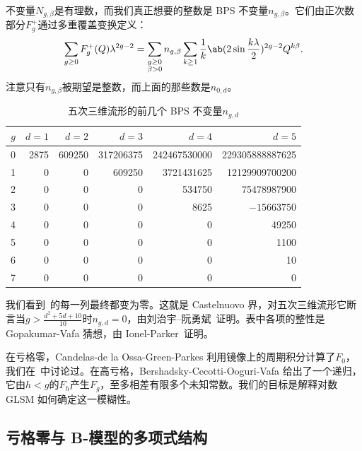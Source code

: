 \documentclass{amsart}
\theoremstyle{definition}
\theoremstyle{remark}
\theoremstyle{plain}
\theoremstyle{definition}
\theoremstyle{remark}
\newcommand{\1}{\mathbf{1}}
\newcommand{\2}{\mathbf{2}}
\newcommand{\3}{\mathbf{3}}
\begin{document}
不变量\(N_{g,\beta}\)是有理数，而我们真正想要的整数是 BPS 不变量\(n_{g,\beta}\)。它们由正次数部分\(F_g^+\)通过多重覆盖变换定义：
\[ \sum_{g \geq 0} F_g^+(Q)\lambda^{2g-2} = \sum_{\substack{g \geq 0 \\ \beta > 0}} n_{g,\beta} \sum_{k \geq 1} \frac{1}{k} \ab(2 \sin \frac{k\lambda}{2})^{2g-2}Q^{k\beta}. \]
注意只有\(n_{g,\beta}\)被期望是整数，而上面的那些数是\(n_{0,d}\)。

\begin{table}[htpb]
    \centering
    \caption{五次三维流形的前几个 BPS 不变量\(n_{g,d}\)}
    \label{tab:quinticbps}
    \begin{tabular}{crrrrr}
        \toprule
        \(g\) & \(d=1\) & \(d=2\) & \(d=3\) & \(d=4\) & \(d=5\) \\
        \midrule
        0 & 2875 & 609250 & 317206375 & 242467530000 & 229305888887625 \\
        1 & 0 & 0 & 609250 & 3721431625 & 12129909700200 \\
        2 & 0 & 0 & 0 & 534750 & 75478987900 \\
        3 & 0 & 0 & 0 & 8625 & \(-15663750\) \\
        4 & 0 & 0 & 0 & 0 & 49250 \\
        5 & 0 & 0 & 0 & 0 & 1100 \\
        6 & 0 & 0 & 0 & 0 & 10 \\
        7 & 0 & 0 & 0 & 0 & 0 \\
        \bottomrule
    \end{tabular}
\end{table}

我们看到~的每一列最终都变为零。这就是 Castelnuovo 界，对五次三维流形它断言当\(g > \frac{d^2+5d+10}{10}\)时\(n_{g,d} = 0\)，由刘治宇–阮勇斌~\cite{LiuRuanCastelnuovo}证明。表中各项的整性是 Gopakumar-Vafa 猜想，由 Ionel-Parker~\cite{IonelParker2018}证明。

在亏格零，Candelas-de la Ossa-Green-Parkes 利用镜像上的周期积分计算了\(F_0\)，我们在~中讨论过。在高亏格，Bershadsky-Cecotti-Ooguri-Vafa 给出了一个递归，它由\(h < g\)的\(F_h\)产生\(F_g\)，至多相差有限多个未知常数。我们的目标是解释对数 GLSM 如何确定这一模糊性。

\subsection{亏格零与 B-模型的多项式结构}%
\label{sub:Genus zero and the polynomial structure of the B-model}
\end{document}
